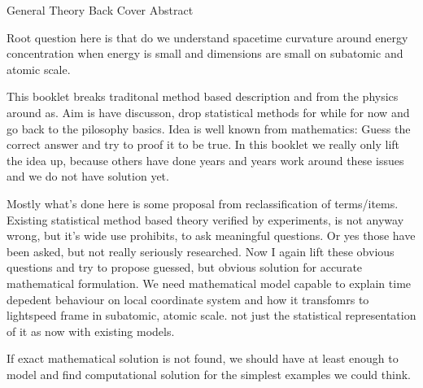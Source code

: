 %
%
%
General Theory Back Cover Abstract\hfill
\label{abstract}


Root question here is that do we understand spacetime curvature around energy
concentration when energy is small and dimensions are small on subatomic and
atomic scale.

This booklet breaks traditonal method based description and from the physics
around as. Aim is have discusson, drop statistical methods for while for now
and go back to the pilosophy basics. Idea is well known from mathematics:
Guess the correct answer and try to proof it to be true. In this booklet we
really only lift the idea up, because others have done years and years work
around these issues and we do not have solution yet.

Mostly what's done here is some proposal from reclassification of terms/items.
Existing statistical method based theory verified by experiments, is not
anyway wrong, but it's wide use prohibits, to ask meaningful questions. Or yes
those have been asked, but not really seriously researched. Now I again lift
these obvious questions and try to propose guessed, but obvious solution for
accurate mathematical formulation. We need mathematical model capable to
explain time depedent behaviour on local coordinate system and how it
transfomrs to lightspeed frame in subatomic, atomic scale. not just the
statistical representation of it as now with existing models.

If exact mathematical solution is not found, we should have at least enough to
model and find computational solution for the simplest examples we could think.
 
